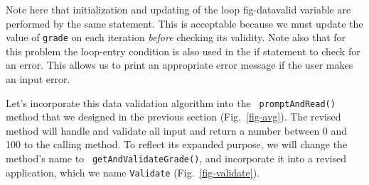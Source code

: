 \noindent Note here that initialization and updating of the loop
{fig-datavalid}
variable are performed by the same statement. This is acceptable
because we must update the value of {\tt grade} on each iteration {\it
before} checking its validity. Note also that for this problem the
loop-entry condition is also used in the if statement to check for an
error.  This allows us to print an appropriate error message if the
user makes an input error.

Let's incorporate this data validation algorithm into the {\tt
prompt\-And\-Read()} method that we designed in the previous section
(Fig.~\ref{fig-avg}). The revised method will handle and validate all
input and return a number between 0 and 100 to the calling method. To
reflect its expanded purpose, we will change the method's name to {\tt
getAndValidateGrade()}, and incorporate it into a revised application,
which we name {\tt Validate} (Fig.~\ref{fig-validate}).

